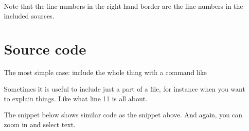 Note that the line numbers in the right hand border are the line
numbers in the included sources.


\section{Source code}
The most simple case: include the whole thing with a command like \\
\verb##


Sometimes it is useful to include just a part of a file, for instance
when you want to explain things. Like what line 11 is all about.\\
\verb##



The snippet below shows similar code as the snippet above.
And again, you can zoom in and select text.







